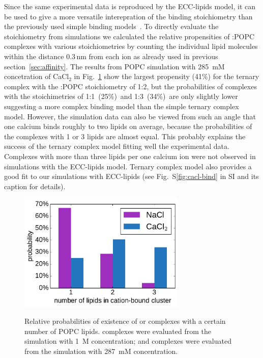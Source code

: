 \documentclass[aip,jcp,twocolumn]{revtex4}
\begin{document}
Since the same experimental data is reproduced by the ECC-lipids model,
it can be used to give a more versatile interepration of the binding stoichiometry than
the previously used simple binding models~\cite{altenbach84,macdonald87}. To directly evaluate the
stoichiometry from simulations we calculated the relative propensities of :POPC
complexes with various stoichiometries by counting the individual lipid
molecules within the distance $0.3\,\mathrm{nm}$ from each  ion
as already used in previous section~\ref{sec:affinity}.
The results from POPC simulation with 285~mM concetration of CaCl$_2$ in
Fig.~\ref{fig:cacl_complexes} show the largest propensity (41\%) for the
ternary complex with the :POPC stoichiometry of 1:2, but 
the probabilities of complexes with the stoichimetries of 1:1~(25\%)~and
1:3~(34\%)~are only slightly lower
suggesting a more complex binding model than the simple ternary complex model.
However, the simulation data can also be viewed from such an angle that
one calcium binds roughly to two lipids on average,
because the probabilities of the complexes with 1 or 3 lipids are almost equal.  
This probably explains the success of the ternary complex model fitting well the
experimental data. 
Complexes with more than three lipids per one calcium ion were not observed in 
simulations with the ECC-lipids model.
Ternary complex model also provides a good fit 
to our simulations with ECC-lipids 
(see Fig.~S\ref{fig:cacl-bind} in SI and its caption for details). 
\begin{figure}[tb!]
  \centering
  \includegraphics[width=8.0cm]{../Fig/ipython_nb/stoichiometry_NaCl-CaCl2_comparison_Ecc-lipids.pdf} \\
  \caption{\label{fig:cacl_complexes}
      Relative probabilities of existence of  or  complexes
      with a certain number of POPC lipids. 
       complexes were evaluated from the simulation with 1~M concentration;
      and  complexes were evaluated from the simulation with 287~mM concentration.
  }
\end{figure}
\end{document}
